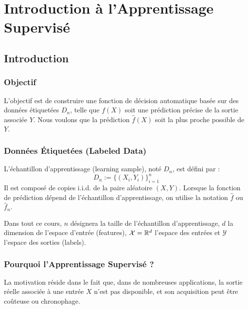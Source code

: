 \chapter{Introduction à l'Apprentissage Supervisé}

\section{Introduction}

\subsection{Objectif}

L'objectif est de construire une fonction de décision automatique basée sur des données étiquetées $D_n$, telle que $f(X)$ soit une prédiction précise de la sortie associée $Y$. Nous voulons que la prédiction $\hat{f}(X)$ soit la plus proche possible de $Y$.

\subsection{Données Étiquetées (Labeled Data)}

\begin{definition}
L'échantillon d'apprentissage (learning sample), noté $D_{n}$, est défini par :
\begin{equation}
D_{n}:=\{(X_{i},Y_{i})\}_{i=1}^{n}
\end{equation}
Il est composé de copies i.i.d. de la paire aléatoire $(X, Y)$. Lorsque la fonction de prédiction dépend de l'échantillon d'apprentissage, on utilise la notation $\hat{f}$ ou $\hat{f}_n$.
\end{definition}

\begin{remarque}[Notations]
Dans tout ce cours, $n$ désignera la taille de l'échantillon d'apprentissage, $d$ la dimension de l'espace d'entrée (features), $\mathcal{X} = \mathbb{R}^d$ l'espace des entrées et $\mathcal{Y}$ l'espace des sorties (labels).
\end{remarque}

\subsection{Pourquoi l'Apprentissage Supervisé ?}

La motivation réside dans le fait que, dans de nombreuses applications, la sortie réelle associée à une entrée $X$ n'est pas disponible, et son acquisition peut être coûteuse ou chronophage.

